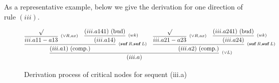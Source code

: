 \documentclass[manuscript,screen]{acmart}
\DeclareMathOperator{\osuf}{\mathbf{suf}}
\begin{document}
As a representative example, below we give the derivation for one direction of rule $(iii)$. 
\begin{figure}
$$
\infer[^{(\vee L)}]
{(iii.a)}
{
    \infer[^{(\osuf R, \osuf L)}]
    {(iii.a1)\mbox{ (comp.)}}
    {
        \infer[^{(\vee R, ax)}]
        {iii.a11 - a13}
        {\surd}
        &
        \infer[^{(wk)}]
        {(iii.a14)}
        {
            (iii.a141)\mbox{ (bud)}
        }
    }
    &
    \infer[^{(\osuf R, \osuf L)}]
    {(iii.a2)\mbox{ (comp.)}}
    {
        \infer[^{(\vee R, ax)}]
        {iii.a21 - a23}{
            \surd
        }
        &
        \infer[^{(wk)}]
        {(iii.a24)}
        {
            (iii.a241)\mbox{ (bud)}
        }
    }
}
$$
\caption{Derivation process of critical nodes for sequent (iii.a)}
\label{figure:Derivation process for sequent (iii.a)}
\end{figure}
\end{document}
